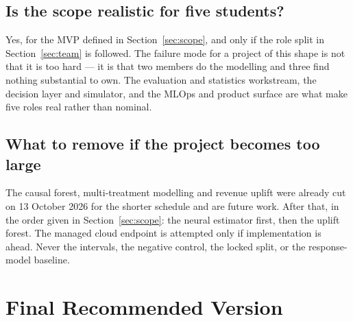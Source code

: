 \documentclass[11pt,a4paper]{article}
\begin{document}
\subsection{Is the scope realistic for five students?}

Yes, for the MVP defined in Section~\ref{sec:scope}, and only if the role split in
Section~\ref{sec:team} is followed. The failure mode for a project of this shape is not that it is
too hard --- it is that two members do the modelling and three find nothing substantial to own.
The evaluation and statistics workstream, the decision layer and simulator, and the MLOps and
product surface are what make five roles real rather than nominal.

\subsection{What to remove if the project becomes too large}

The causal forest, multi-treatment modelling and revenue uplift were already cut on 13 October 2026
for the shorter schedule and are future work. After that, in the order given in
Section~\ref{sec:scope}: the neural estimator first, then the uplift forest. The managed cloud
endpoint is attempted only if implementation is ahead. Never the intervals, the negative control,
the locked split, or the response-model baseline.

\section{Final Recommended Version}
\end{document}
